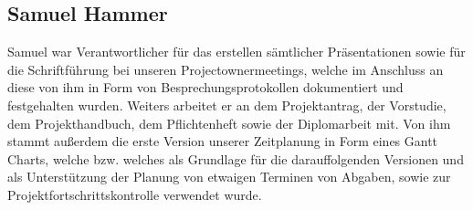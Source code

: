 \subsection{Samuel Hammer}
Samuel war Verantwortlicher für das erstellen sämtlicher Präsentationen sowie für die Schriftführung bei unseren Projectownermeetings, welche im Anschluss an diese von ihm in Form von Besprechungsprotokollen dokumentiert und festgehalten wurden. Weiters arbeitet er an dem Projektantrag, der Vorstudie, dem Projekthandbuch, dem Pflichtenheft sowie der Diplomarbeit mit. Von ihm stammt außerdem die erste Version unserer Zeitplanung in Form eines Gantt Charts, welche bzw. welches als Grundlage für die darauffolgenden Versionen und als Unterstützung der Planung von etwaigen Terminen von Abgaben, sowie zur Projektfortschrittskontrolle verwendet wurde.

